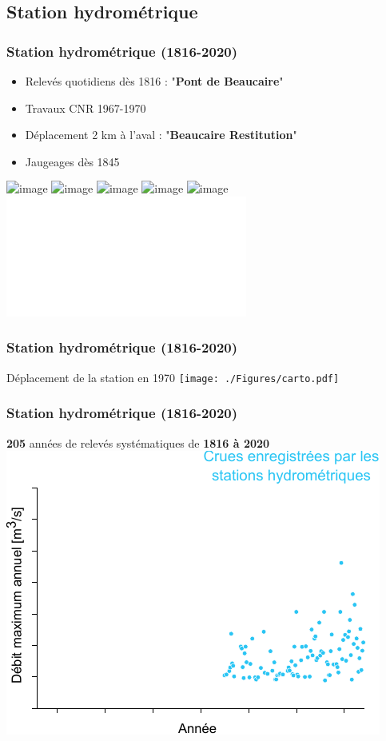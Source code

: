 \documentclass[compress,9pt]{beamer}
\begin{document}
	\subsection{Station hydrométrique}
	\begin{frame}%
		\frametitle{Station hydrométrique (1816-2020)}
		\begin{minipage}{.4\textwidth}
			\begin{itemize}
				\item<1->[$\vartriangleright$] Relevés quotidiens dès 1816 : "\textbf{Pont de Beaucaire}"\\
				\vfill
				\item<4->[$\vartriangleright$] Travaux CNR 1967-1970\\
				\vfill
				\item<5->[$\vartriangleright$] Déplacement 2 km à l'aval : "\textbf{Beaucaire Restitution}"\\
				\vfill
				\item<6>[$\vartriangleright$] Jaugeages dès 1845\\
			\end{itemize}
		\end{minipage}
		\hfill
		\begin{minipage}{.59\textwidth}
			\begin{center}
	      		\includegraphics<1>[width = \textwidth]{./Figures/Pt.jpg} 
	      		\includegraphics<2>[width = .5\textwidth]{./Figures/StationBCR.jpg} 
	      		\includegraphics<3>[width = .9\columnwidth]{./Figures/TabObs.jpg} 
	      		\includegraphics<4>[width = .9\columnwidth]{./Figures/Vallab.jpg} 
	      		\includegraphics<5>[width = .9\columnwidth]{./Figures/EchelleRestit.jpg} 
	      		\includegraphics<6>[width = \textwidth]{./Figures/Jaus.pdf}
			\end{center}
		\end{minipage}
	\end{frame}
	
	\begin{frame}%
		\frametitle{Station hydrométrique (1816-2020)}
		\vfill
		Déplacement de la station en 1970
		\centering
		\vfill
		\texttt{[image: ./Figures/carto.pdf]} 
	\end{frame}
	
	\begin{frame}%
		\frametitle{Station hydrométrique (1816-2020)}
		\centering
		\textbf{205} années de relevés systématiques de \textbf{1816 à 2020}
		\vfill		
		\centering
      	\includegraphics[width = .5\textwidth]{./Figures/HistoFloods1.pdf}
	\end{frame}	
	
\end{document}
